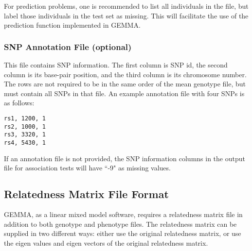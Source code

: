 \documentclass[11pt]{article}
\begin{document}
For prediction problems, one is recommended to list all individuals in the file, but label those individuals in the test set as missing. This will facilitate the use of the prediction function implemented in GEMMA. 

\subsubsection{SNP Annotation File (optional)}
This file contains SNP information. The first column is SNP id, the second column is its base-pair position, and the third column is its chromosome number. The rows are not required to be in the same order of the mean genotype file, but must contain all SNPs in that file. An example annotation file with four SNPs is as follows:
%
\begin{verbatim}
rs1, 1200, 1
rs2, 1000, 1
rs3, 3320, 1
rs4, 5430, 1
\end{verbatim}
%
If an annotation file is not provided, the SNP information columns in the output file for association tests will have ``-9" as missing values. 

\subsection{Relatedness Matrix File Format}
GEMMA, as a linear mixed model software, requires a relatedness matrix file in addition to both genotype and phenotype files. The relatedness matrix can be supplied in two different ways: either use the original relatedness matrix, or use the eigen values and eigen vectors of the original relatedness matrix.
\end{document}
